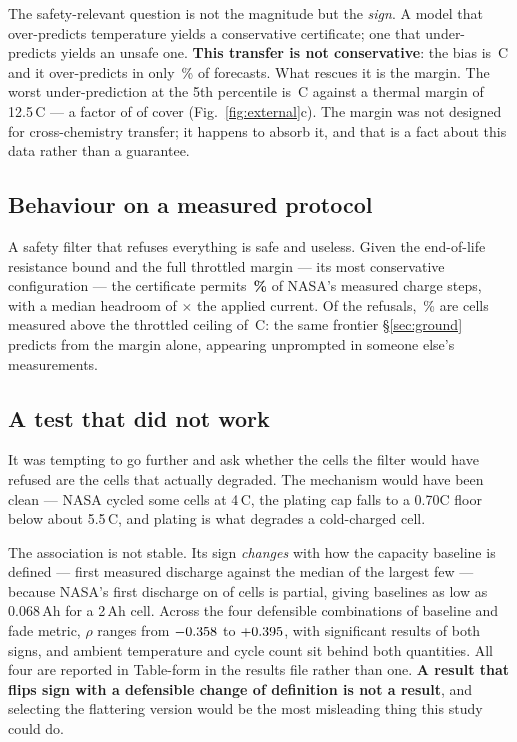 \documentclass[11pt,letterpaper]{article}
\theoremstyle{definition}
\theoremstyle{remark}
\newcommand{\SI}[2]{#1\,#2}
\newcommand{\degreeCelsius}{\degC}
\newcommand{\degC}{\ifmmode{^\circ}\mathrm{C}\else\textdegree C\fi}
\begin{document}
The safety-relevant question is not the magnitude but the \emph{sign}. A model that
over-predicts temperature yields a conservative certificate; one that under-predicts yields an
unsafe one. \textbf{This transfer is not conservative}: the bias is \SI{\nBias}{\degreeCelsius} and it
over-predicts in only \nOverFrac\,\% of forecasts. What rescues it is the margin. The worst
under-prediction at the 5th percentile is \SI{\nUnderWorst}{\degreeCelsius} against a thermal margin of
\SI{12.5}{\degreeCelsius} --- a factor of \textbf{\nMarginCover} of cover (Fig.~\ref{fig:external}c). The
margin was not designed for cross-chemistry transfer; it happens to absorb it, and that is a
fact about this data rather than a guarantee.

\subsection{Behaviour on a measured protocol}

A safety filter that refuses everything is safe and useless. Given the end-of-life resistance
bound and the full throttled margin --- its most conservative configuration --- the certificate
permits \textbf{\nPermitFrac\,\%} of NASA's measured charge steps, with a median headroom of
\nHeadroom$\times$ the applied current. Of the refusals, \nRefuseCeil\,\% are cells measured
above the throttled ceiling of \SI{\nCeiling}{\degreeCelsius}: the same frontier \S\ref{sec:ground}
predicts from the margin alone, appearing unprompted in someone else's measurements.

\subsection{A test that did not work}

It was tempting to go further and ask whether the cells the filter would have refused are the
cells that actually degraded. The mechanism would have been clean --- NASA cycled some cells at
\SI{4}{\degreeCelsius}, the plating cap falls to a 0.70C floor below about \SI{5.5}{\degreeCelsius}, and plating is what
degrades a cold-charged cell.

The association is not stable. Its sign \emph{changes} with how the capacity baseline is
defined --- first measured discharge against the median of the largest few --- because NASA's
first discharge on \nBadBaselines{} of \nCapCells{} cells is partial, giving baselines as low as
0.068\,Ah for a 2\,Ah cell. Across the four defensible combinations of baseline and fade metric,
$\rho$ ranges from $-0.358$ to $+0.395$, with significant results of both signs, and
ambient temperature and cycle count sit behind both quantities. All four are reported in
Table-form in the results file rather than one. \textbf{A result that flips sign with a
defensible change of definition is not a result}, and selecting the flattering version would be
the most misleading thing this study could do.
\end{document}

